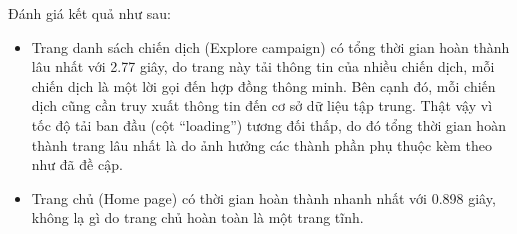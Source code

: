 \documentclass[../main-report.tex]{subfiles}
\begin{document}
Đánh giá kết quả như sau:

\begin{itemize}
\item Trang danh sách chiến dịch (Explore campaign) có tổng thời gian hoàn thành lâu nhất với 2.77 giây, do trang này tải thông tin của nhiều chiến dịch, mỗi chiến dịch là một lời gọi đến hợp đồng thông minh. Bên cạnh đó, mỗi chiến dịch cũng cần truy xuất thông tin đến cơ sở dữ liệu tập trung. Thật vậy vì tốc độ tải ban đầu (cột ``loading'') tương đối thấp, do đó tổng thời gian hoàn thành trang lâu nhất là do ảnh hưởng các thành phần phụ thuộc kèm theo như đã đề cập.
\item Trang chủ (Home page) có thời gian hoàn thành nhanh nhất với 0.898 giây, không lạ gì do trang chủ hoàn toàn là một trang tĩnh.
\end{itemize}
\end{document}

